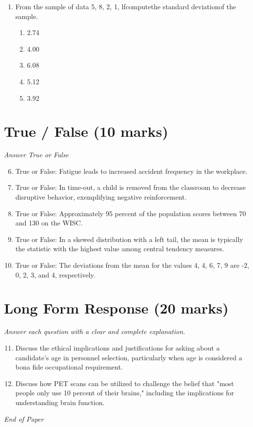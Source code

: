 \documentclass[12pt]{article}
\begin{document}
\begin{enumerate}[label=\arabic*.]
\begin{enumerate}[label=(\alph*)]
    \item Hyperthyroidism
    \item Addison's disease
    \item Low levels of melatonin
    \item An excess of testosterone
    \item Hypothyroidism
\end{enumerate}
\item From the sample of data 5, 8, 2, 1, lfcomputethe standard deviationof the sample.
\begin{enumerate}[label=(\alph*)]
    \item 2.74
    \item 4.00
    \item 6.08
    \item 5.12
    \item 3.92
\end{enumerate}
\end{enumerate}

\section*{True / False (10 marks)}
\textit{Answer True or False}
\begin{enumerate}[label=\arabic*.]
\setcounter{enumi}{5}
\item True or False: Fatigue leads to increased accident frequency in the workplace.
\item True or False: In time-out, a child is removed from the classroom to decrease disruptive behavior, exemplifying negative reinforcement.
\item True or False: Approximately 95 percent of the population scores between 70 and 130 on the WISC.
\item True or False: In a skewed distribution with a left tail, the mean is typically the statistic with the highest value among central tendency measures.
\item True or False: The deviations from the mean for the values 4, 4, 6, 7, 9 are -2, 0, 2, 3, and 4, respectively.
\end{enumerate}

\section*{Long Form Response (20 marks)}
\textit{Answer each question with a clear and complete explanation.}
\begin{enumerate}[label=\arabic*.]
\setcounter{enumi}{10}
\item Discuss the ethical implications and justifications for asking about a candidate's age in personnel selection, particularly when age is considered a bona fide occupational requirement.
\item Discuss how PET scans can be utilized to challenge the belief that "most people only use 10 percent of their brains," including the implications for understanding brain function.
\end{enumerate}

\vfill
\noindent\textit{End of Paper}
\end{document}
